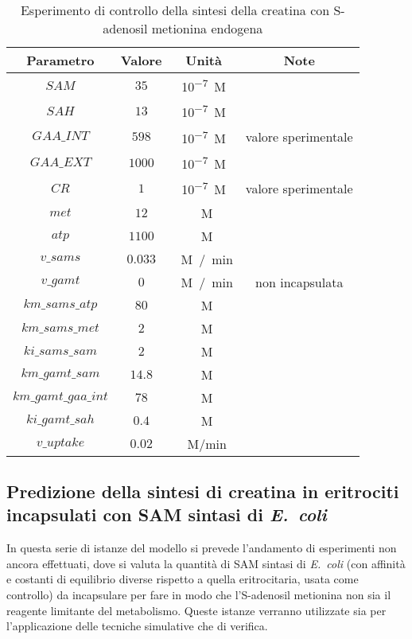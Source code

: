 \begin{table}[H]
	\centering
	\begin{tabular}{| c | c | c | c |}
	\hline
	Parametro & Valore & Unit\`a & Note \\
		\hline
		$SAM$ & $35$ & \si{10^{-7} M} & \cite{oden1983s} \\
		\hline
		$SAH$ & $13$ & \si{10^{-7} M} & \\
		\hline
		$GAA\_INT$ & $598$ & \si{10^{-7} M} &  valore sperimentale \\
		\hline
		$GAA\_EXT$ & $1000$ & \si{10^{-7} M} & \\
		\hline
		$CR$ & $1$ & \si{10^{-7} M} &  valore sperimentale \\
		\hline
		$met$ & $12$ & \si{\mu M} & \\
		\hline
		$atp$ & $1100$ & \si{\mu M} & \\
		\hline
		$v\_sams$ & $0.033$ & \si{\mu M / min} & \\
		\hline
		$v\_gamt$ & $0$ & \si{\mu M / min} & non incapsulata \\
		\hline
		$km\_sams\_atp$ & $80$ & \si{\mu M} & \\
		\hline
		$km\_sams\_met$ & $2$ & \si{\mu M} & \\
		\hline
		$ki\_sams\_sam$ & $2$ & \si{\mu M} & \\
		\hline
		$km\_gamt\_sam$ & $14.8$ & \si{\mu M} & \\
		\hline
		$km\_gamt\_gaa\_int$ & $78$ & \si{\mu M} & \\
		\hline
		$ki\_gamt\_sah$ & $0.4$ & \si{\mu M} & \\
		\hline
		$v\_uptake$ & $0.02$ & \si{\mu M/min} & \\
		\hline
	\end{tabular}
	\caption{Esperimento di controllo della sintesi della creatina con S-adenosil metionina endogena}
	\label{mod:7}
\end{table}

\subsection{Predizione della sintesi di creatina in eritrociti incapsulati con SAM sintasi di \emph{E.\ coli}}
In questa serie di istanze del modello si prevede l'andamento di esperimenti non ancora effettuati, dove si valuta la quantit\`a di SAM sintasi di \emph{E.\ coli} (con affinit\`a e costanti di equilibrio diverse rispetto a quella eritrocitaria, usata come controllo) da incapsulare per fare in modo che l'S-adenosil metionina non sia il reagente limitante del metabolismo.
Queste istanze verranno utilizzate sia per l'applicazione delle tecniche simulative che di verifica.


